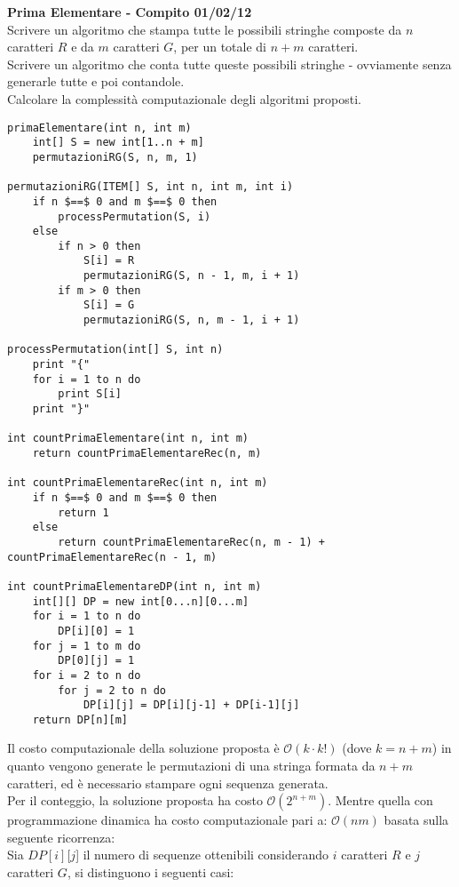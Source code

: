 \documentclass[../cheatSheetAlgoritmi.tex]{subfiles}
\begin{document}
\bigskip
\textbf{Prima Elementare - Compito 01/02/12}\\
Scrivere un algoritmo che stampa tutte le possibili stringhe composte da $n$ caratteri $R$ e da $m$ caratteri $G$, per un totale di $n+m$ caratteri.\\
Scrivere un algoritmo che conta tutte queste possibili stringhe - ovviamente senza generarle tutte e poi contandole.\\
Calcolare la complessità computazionale degli algoritmi proposti.
\newpage
\begin{lstlisting}[caption=Permutazioni dei caratteri G e R e conteggio]
primaElementare(int n, int m)
    int[] S = new int[1..n + m]
    permutazioniRG(S, n, m, 1)
        
permutazioniRG(ITEM[] S, int n, int m, int i)
    if n $==$ 0 and m $==$ 0 then
        processPermutation(S, i)
    else 
        if n > 0 then
            S[i] = R
            permutazioniRG(S, n - 1, m, i + 1)
        if m > 0 then
            S[i] = G
            permutazioniRG(S, n, m - 1, i + 1)
                
processPermutation(int[] S, int n) 
    print "{"
    for i = 1 to n do
        print S[i]
    print "}"
    
int countPrimaElementare(int n, int m)
    return countPrimaElementareRec(n, m)
        
int countPrimaElementareRec(int n, int m)
    if n $==$ 0 and m $==$ 0 then
        return 1
    else
        return countPrimaElementareRec(n, m - 1) + countPrimaElementareRec(n - 1, m)

int countPrimaElementareDP(int n, int m)
    int[][] DP = new int[0...n][0...m]
    for i = 1 to n do
        DP[i][0] = 1
    for j = 1 to m do
        DP[0][j] = 1
    for i = 2 to n do
        for j = 2 to n do
            DP[i][j] = DP[i][j-1] + DP[i-1][j]
    return DP[n][m]
\end{lstlisting}
Il costo computazionale della soluzione proposta è $\mathcal{O}(k \cdot k!)$ (dove $k = n + m$) in quanto vengono generate le permutazioni di una stringa formata da $n + m$ caratteri, ed è necessario stampare ogni sequenza generata. \\
Per il conteggio, la soluzione proposta ha costo $\mathcal{O}(2^{n + m})$. Mentre quella con programmazione dinamica ha costo computazionale pari a: $\mathcal{O}(nm)$ basata sulla seguente ricorrenza: \\
Sia $DP[i][j$] il numero di sequenze ottenibili considerando $i$ caratteri $R$ e $j$ caratteri $G$, si distinguono i seguenti casi:
\end{document}
